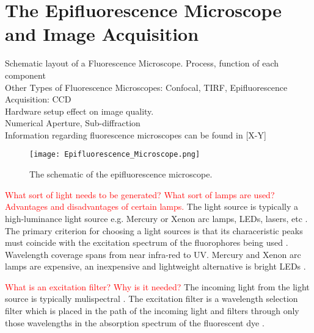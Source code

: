 
\section{The Epifluorescence Microscope and Image Acquisition}
\label{sec:TheEpifluorescenceMicroscope}

Schematic layout of a Fluorescence Microscope. Process, function of each component\\
Other Types of Fluorescence Microscopes: Confocal, TIRF, Epifluorescence\\
Acquisition: CCD\\
Hardware setup effect on image quality.\\
Numerical Aperture, Sub-diffraction\\
Information regarding fluorescence microscopes can be found in [X-Y]

\begin{figure}[!t]
	\centering
	\texttt{[image: Epifluorescence\_Microscope.png]}
	\caption{The schematic of the epifluorescence microscope.}
	\label{fig:epifluorescencemicroscope}
\end{figure}

\begin{definition}
	\textcolor{red}{What sort of light needs to be generated? What sort of lamps are used? Advantages and disadvantages of certain lamps.}
	The light source is typically a high-luminance light source e.g. Mercury or Xenon arc lamps, LEDs, lasers, etc  \citep{Danek2012,Hubeny2008,LichtmanConchello2005,Rice2016,ThermoFisher2016}.
	The primary criterion for choosing a light sources is that its characeristic peaks must coincide with the excitation spectrum of the fluorophores being used \citep{LichtmanConchello2005,Spring2003,Fatima2008}.
	Wavelength coverage spans from near infra-red to UV. Mercury and Xenon arc lamps are expensive, an inexpensive and lightweight alternative is bright LEDs \citep{Fatima2008,Dobrucki2013,SpringDavisdson2016}.
\end{definition}

\begin{definition}
	\textcolor{red}{What is an excitation filter? Why is it needed?}
	The incoming light from the light source is typically mulispectral \citep{SpringDavisdson2016}. 
	The excitation filter is a wavelength selection filter which is placed in the path of the incoming light and filters through only those wavelengths in the absorption spectrum of the fluorescent dye \citep{ThermoFisher2016,Danek2012,Hubeny2008,LichtmanConchello2005,Spring2003,CudeBurke2014,Fatima2008,Dobrucki2013}.
\end{definition}


